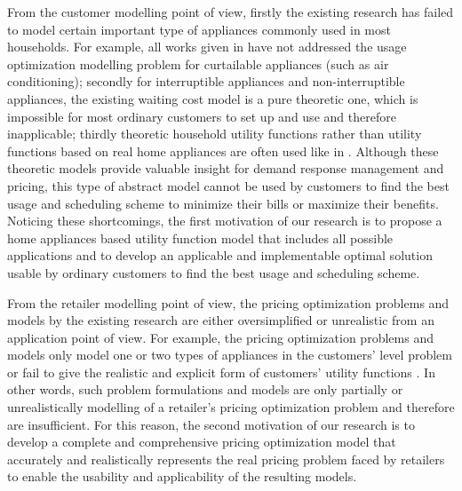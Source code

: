 \documentclass[10pt,journal]{IEEEtran}
\theoremstyle{definition}
\theoremstyle{plain} \newtheorem{theo}{Theorem} \newtheorem{prop}{Proposition}  \newtheorem{lemm}{Lemma}
\begin{document}
From the customer modelling point of view, firstly the existing research has failed to model certain important type of appliances commonly used in most households. For example, all works given in \cite{Leon-garcia2010, Mohsenian-Rad2010,adika2013autonomous,liu2014peak} have not addressed the usage optimization modelling problem for curtailable appliances (such as air conditioning);
secondly for interruptible appliances and non-interruptible appliances, the existing waiting cost model \cite{Leon-garcia2010} \cite{chen2011innovative} is a pure theoretic one, which is impossible for most ordinary customers to set up and use and therefore inapplicable; thirdly theoretic household utility functions rather than utility functions based on real home appliances are often used like in \cite{Samadi2010,Li2011,yang2012game}. Although these theoretic models provide valuable insight for demand response management and pricing, this type of abstract model cannot be used by customers to find the best usage and scheduling scheme to minimize their bills or maximize their benefits. Noticing these shortcomings, the first motivation of our research is to propose a home appliances based utility function model that includes all possible applications and to develop an applicable and implementable optimal solution usable by ordinary customers to find the best usage and scheduling scheme. 

From the retailer modelling point of view, the pricing optimization problems and models by the existing research are either oversimplified or unrealistic from an application point of view. For example, the pricing optimization problems and models 
only model one or two types of appliances in the customers' level problem \cite{chen2011innovative}\cite{qian2013demand}\cite{zugno2013bilevel} or  fail to give the realistic and explicit form of customers' utility functions \cite{Yu2011}\cite{chen2012optimal}\cite{maharjan2013dependable} \cite{chai2014demand}. In other words, such problem formulations and models are only partially or unrealistically modelling of a retailer's pricing optimization problem and therefore are insufficient. For this reason, the second motivation of our research is to develop a complete and comprehensive pricing optimization model that accurately and realistically represents the real pricing problem faced by retailers to enable the usability and applicability of the resulting models. 
\end{document}
